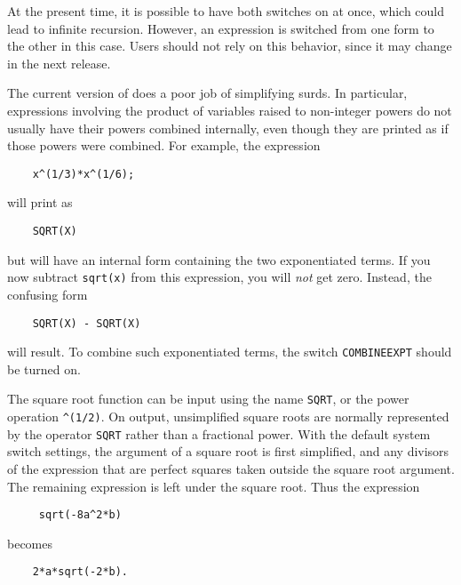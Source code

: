 At the present time, it is possible to have both switches on at once,
which could lead to infinite recursion.  However, an expression is
switched from one form to the other in this case.  Users should not rely
on this behavior, since it may change in the next release.

The current version of {\REDUCE} does a poor job of simplifying surds.  In
particular, expressions involving the product of variables raised to
non-integer powers do not usually have their powers combined internally,
even though they are printed as if those powers were combined.  For
example, the expression
\begin{verbatim}
	x^(1/3)*x^(1/6);
\end{verbatim}
will print as
\begin{verbatim}
	SQRT(X)
\end{verbatim}
but will have an internal form containing the two exponentiated terms.
If you now subtract {\tt sqrt(x)} from this expression, you will {\em not\/}
get zero.  Instead, the confusing form
\begin{verbatim}
	SQRT(X) - SQRT(X)
\end{verbatim}
will result.  To combine such exponentiated terms, the switch
{\tt COMBINEEXPT} should be turned on.

The square root function can be input using the name {\tt SQRT}, or the
power operation {\tt \verb|^|(1/2)}.  On output, unsimplified square roots
are normally represented by the operator {\tt SQRT} rather than a
fractional power.  With the default system switch settings, the argument
of a square root is first simplified, and any divisors of the expression
that are perfect squares taken outside the square root argument.  The
remaining expression is left under the square root.
Thus the expression
\begin{verbatim}
	 sqrt(-8a^2*b)
 \end{verbatim}
becomes
\begin{verbatim}
	2*a*sqrt(-2*b).
\end{verbatim}

